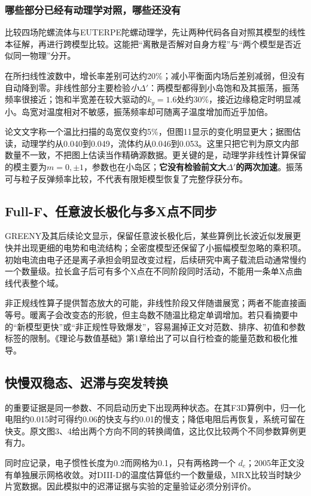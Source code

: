 \documentclass[UTF8,a4paper,11pt,openany,fontset=fandol]{ctexbook}
\begin{document}
\subsubsection{哪些部分已经有动理学对照，哪些还没有}
\citet{E475}比较四场陀螺流体与EUTERPE陀螺动理学，先让两种代码各自对照其模型的线性本征解，再进行跨模型比较。这能把“离散是否解对自身方程”与“两个模型是否近似同一物理”分开。

在所扫线性波数中，增长率差别可达约20\%；减小平衡面内场后差别减弱，但没有自动降到零。非线性部分主要检验\emph{小}$\Delta'$：两模型都得到小岛饱和及其振荡，振荡频率很接近；饱和半宽差在较大驱动的$k_y=1.6$处约30\%，接近边缘稳定时明显减小。岛宽对温度相对不敏感，振荡频率却可随离子温度增加而近乎加倍。

论文文字称一个温比扫描的岛宽仅变约5\%，但图11显示的变化明显更大；据图估读，动理学约从0.040到0.049，流体约从0.046到0.053。这里只把它判为原文内部数量不一致，不把图上估读当作精确源数据。更关键的是，动理学非线性计算保留的模主要为$m=0,\pm1$，参数也在小岛区；\textbf{它没有检验前文大$\Delta'$的两次加速}。振荡可与粒子反弹频率比较，不代表有限矩模型恢复了完整俘获分布。

\subsection{Full-F、任意波长极化与多X点不同步}
GREENY及其后续论文\citep{E473,L314}显示，保留任意波长极化后，某些算例比长波近似发展更快并出现更细的电势和电流结构；全密度模型还保留了小振幅模型忽略的乘积项。初始电流由电子还是离子承担会明显改变过程，后续研究中离子载流启动通常慢约一个数量级。拉长盒子后可有多个X点在不同阶段同时活动，不能用一条单X点曲线代表整个域。

非正规线性算子提供暂态放大的可能，非线性阶段又伴随谱展宽；两者不能直接画等号。暖离子会改变态的形貌，但主岛数不随温比稳定单调增加。若只看摘要中的“新模型更快”或“非正规性导致爆发”，容易漏掉正文对范数、排序、初值和参数标签的限制。《理论与数值基础》第1章给出了可以自行检查的能量范数和极化推导。

\subsection{快慢双稳态、迟滞与突发转换}
\citet{Cassak2005}的重要证据是同一参数、不同启动历史下出现两种状态。在其F3D算例中，归一化电阻约0.015时可得约0.06的快支与约0.01的慢支；降低电阻后再恢复，系统可留在快支。原文图3、4给出两个方向不同的转换阈值，这比仅比较两个不同参数算例更有力。

同时应记录，电子惯性长度为0.2而网格为0.1，只有两格跨一个 $d_e$；2005年正文没有单独展示网格收敛。对DIII-D的温度估算低约一个数量级，MRX比较当时缺少片宽数据。因此模拟中的迟滞证据与实验的定量验证必须分别评价。
\end{document}
